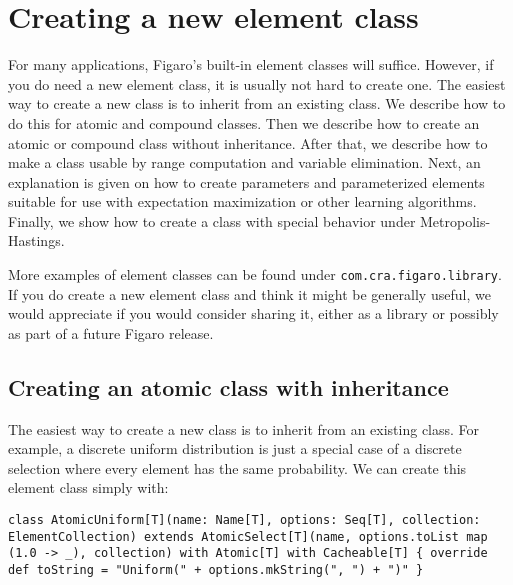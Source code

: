 
\chapter{Creating a new element class} %

\label{Creating a new element class} %

For many applications, Figaro's built-in element classes will suffice. However, if you do need a new element class, it is usually not hard to create one. The easiest way to create a new class is to inherit from an existing class. We describe how to do this for atomic and compound classes. Then we describe how to create an atomic or compound class without inheritance. After that, we describe how to make a class usable by range computation and variable elimination. Next, an explanation is given on how to create parameters and parameterized elements suitable for use with expectation maximization or other learning algorithms. Finally, we show how to create a class with special behavior under Metropolis-Hastings.

More examples of element classes can be found under \texttt{com.cra.fig\-aro.library}. If you do create a new element class and think it might be generally useful, we would appreciate if you would consider sharing it, either as a library or possibly as part of a future Figaro release.

\section{Creating an atomic class with inheritance}

The easiest way to create a new class is to inherit from an existing class. For example, a discrete uniform distribution is just a special case of a discrete selection where every element has the same probability. We can create this element class simply with:

\begin{flushleft}
\texttt{class AtomicUniform[T](name: Name[T], options: Seq[T], collection: \newline ElementCollection) extends
\newline \tab AtomicSelect[T](name, options.toList map (1.0 -> \_), collection)
\newline \tab with Atomic[T] with Cacheable[T] \{
\newline \tab override def toString = "Uniform(" + options.mkString(", ") + ")"
\}
}
\end{flushleft}

